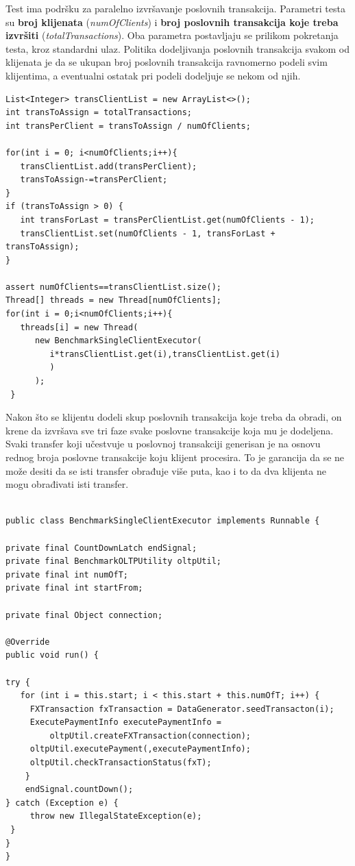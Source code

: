 \documentclass[12pt,oneside]{memoir}
\begin{document}
Test ima podršku za paralelno izvršavanje poslovnih transakcija. Parametri testa su \textbf{broj klijenata} (\textit{numOfClients}) i \textbf{broj poslovnih transakcija koje treba izvršiti} (\textit{totalTransactions}). Oba parametra postavljaju se prilikom pokretanja testa, kroz standardni ulaz. Politika dodeljivanja poslovnih transakcija svakom od klijenata je da se ukupan broj poslovnih transakcija ravnomerno podeli svim klijentima, a eventualni ostatak pri podeli dodeljuje se nekom od njih.

\begin{lstlisting}[title={Implementacija politike podele posla klijentima},captionpos=t]
List<Integer> transClientList = new ArrayList<>();
int transToAssign = totalTransactions;
int transPerClient = transToAssign / numOfClients;

for(int i = 0; i<numOfClients;i++){	
   transClientList.add(transPerClient);
   transToAssign-=transPerClient;
}
if (transToAssign > 0) {
   int transForLast = transPerClientList.get(numOfClients - 1);
   transClientList.set(numOfClients - 1, transForLast + transToAssign);
}

assert numOfClients==transClientList.size();
Thread[] threads = new Thread[numOfClients];
for(int i = 0;i<numOfClients;i++){
   threads[i] = new Thread(
      new BenchmarkSingleClientExecutor(
         i*transClientList.get(i),transClientList.get(i)
         )
      );
 }
\end{lstlisting}


Nakon što se klijentu dodeli skup poslovnih transakcija koje treba da obradi, on krene da izvršava sve tri faze svake poslovne transakcije koja mu je dodeljena. Svaki transfer koji učestvuje u poslovnoj transakciji generisan je na osnovu rednog broja poslovne transakcije koju klijent procesira. To je garancija da se ne može desiti da se isti transfer obrađuje više puta, kao i to da dva klijenta ne mogu obrađivati isti transfer.

\begin{lstlisting}[title={BenchmarkSingleClientExecutor.java},captionpos=t]

public class BenchmarkSingleClientExecutor implements Runnable {

private final CountDownLatch endSignal;
private final BenchmarkOLTPUtility oltpUtil;
private final int numOfT;
private final int startFrom;

private final Object connection;

@Override
public void run() {

try {
   for (int i = this.start; i < this.start + this.numOfT; i++) {
     FXTransaction fxTransaction = DataGenerator.seedTransacton(i);
     ExecutePaymentInfo executePaymentInfo = 
         oltpUtil.createFXTransaction(connection);
     oltpUtil.executePayment(,executePaymentInfo);
     oltpUtil.checkTransactionStatus(fxT);
    }
    endSignal.countDown();
} catch (Exception e) {
     throw new IllegalStateException(e);
 }
}
}
\end{lstlisting}
\end{document}

